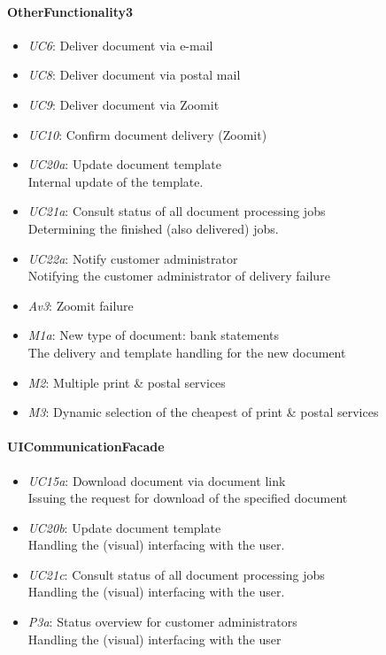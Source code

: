 \documentclass[a4paper,10pt]{article}
\begin{document}
\paragraph{OtherFunctionality3}
\begin{itemize}
    \item \emph{UC6}: Deliver document via e-mail
    \item \emph{UC8}: Deliver document via postal mail
    \item \emph{UC9}: Deliver document via Zoomit
    \item \emph{UC10}: Confirm document delivery (Zoomit)
    \item \emph{UC20a}: Update document template\\
    Internal update of the template.
    \item \emph{UC21a}: Consult status of all document processing jobs\\
    Determining the finished (also delivered) jobs.
    \item \emph{UC22a}: Notify customer administrator\\
    Notifying the customer administrator of delivery failure
    \item \emph{Av3}: Zoomit failure
    \item \emph{M1a}: New type of document: bank statements\\
    The delivery and template handling for the new document
    \item \emph{M2}: Multiple print \& postal services
    \item \emph{M3}: Dynamic selection of the cheapest of print \& postal services
\end{itemize}


\paragraph{UICommunicationFacade}
\begin{itemize}
    \item \emph{UC15a}: Download document via document link\\
    Issuing the request for download of the specified document
    \item \emph{UC20b}: Update document template\\
    Handling the (visual) interfacing with the user.
    \item \emph{UC21c}: Consult status of all document processing jobs\\
    Handling the (visual) interfacing with the user. 
    \item \emph{P3a}: Status overview for customer administrators\\
    Handling the (visual) interfacing with the user
\end{itemize}
\end{document}
